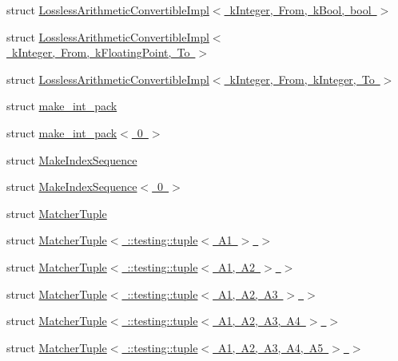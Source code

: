 \begin{DoxyCompactItemize}
\item 
struct \mbox{\hyperlink{structtesting_1_1internal_1_1_lossless_arithmetic_convertible_impl_3_01k_integer_00_01_from_00_01k_bool_00_01bool_01_4}{Lossless\+Arithmetic\+Convertible\+Impl$<$ k\+Integer, From, k\+Bool, bool $>$}}
\item 
struct \mbox{\hyperlink{structtesting_1_1internal_1_1_lossless_arithmetic_convertible_impl_3_01k_integer_00_01_from_00_01k_floating_point_00_01_to_01_4}{Lossless\+Arithmetic\+Convertible\+Impl$<$ k\+Integer, From, k\+Floating\+Point, To $>$}}
\item 
struct \mbox{\hyperlink{structtesting_1_1internal_1_1_lossless_arithmetic_convertible_impl_3_01k_integer_00_01_from_00_01k_integer_00_01_to_01_4}{Lossless\+Arithmetic\+Convertible\+Impl$<$ k\+Integer, From, k\+Integer, To $>$}}
\item 
struct \mbox{\hyperlink{structtesting_1_1internal_1_1make__int__pack}{make\+\_\+int\+\_\+pack}}
\item 
struct \mbox{\hyperlink{structtesting_1_1internal_1_1make__int__pack_3_010_01_4}{make\+\_\+int\+\_\+pack$<$ 0 $>$}}
\item 
struct \mbox{\hyperlink{structtesting_1_1internal_1_1_make_index_sequence}{Make\+Index\+Sequence}}
\item 
struct \mbox{\hyperlink{structtesting_1_1internal_1_1_make_index_sequence_3_010_01_4}{Make\+Index\+Sequence$<$ 0 $>$}}
\item 
struct \mbox{\hyperlink{structtesting_1_1internal_1_1_matcher_tuple}{Matcher\+Tuple}}
\item 
struct \mbox{\hyperlink{structtesting_1_1internal_1_1_matcher_tuple_3_01_1_1testing_1_1tuple_3_01_a1_01_4_01_4}{Matcher\+Tuple$<$ \+::testing\+::tuple$<$ A1 $>$ $>$}}
\item 
struct \mbox{\hyperlink{structtesting_1_1internal_1_1_matcher_tuple_3_01_1_1testing_1_1tuple_3_01_a1_00_01_a2_01_4_01_4}{Matcher\+Tuple$<$ \+::testing\+::tuple$<$ A1, A2 $>$ $>$}}
\item 
struct \mbox{\hyperlink{structtesting_1_1internal_1_1_matcher_tuple_3_01_1_1testing_1_1tuple_3_01_a1_00_01_a2_00_01_a3_01_4_01_4}{Matcher\+Tuple$<$ \+::testing\+::tuple$<$ A1, A2, A3 $>$ $>$}}
\item 
struct \mbox{\hyperlink{structtesting_1_1internal_1_1_matcher_tuple_3_01_1_1testing_1_1tuple_3_01_a1_00_01_a2_00_01_a3_00_01_a4_01_4_01_4}{Matcher\+Tuple$<$ \+::testing\+::tuple$<$ A1, A2, A3, A4 $>$ $>$}}
\item 
struct \mbox{\hyperlink{structtesting_1_1internal_1_1_matcher_tuple_3_01_1_1testing_1_1tuple_3_01_a1_00_01_a2_00_01_a3_00_01_a4_00_01_a5_01_4_01_4}{Matcher\+Tuple$<$ \+::testing\+::tuple$<$ A1, A2, A3, A4, A5 $>$ $>$}}

\end{DoxyCompactItemize}
